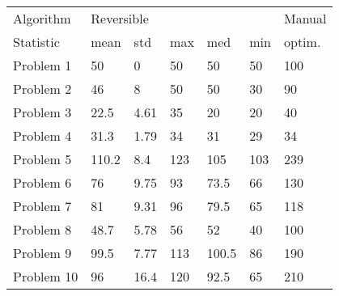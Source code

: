 \begin{tabular}{lllllll}
\toprule
Algorithm & \multicolumn{5}{l}{Reversible} & Manual \\
Statistic &       mean &   std &  max &    med &  min & optim. \\
\midrule
Problem 1  &         50 &     0 &   50 &     50 &   50 &    100 \\
Problem 2  &         46 &     8 &   50 &     50 &   30 &     90 \\
Problem 3  &       22.5 &  4.61 &   35 &     20 &   20 &     40 \\
Problem 4  &       31.3 &  1.79 &   34 &     31 &   29 &     34 \\
Problem 5  &      110.2 &   8.4 &  123 &    105 &  103 &    239 \\
Problem 6  &         76 &  9.75 &   93 &   73.5 &   66 &    130 \\
Problem 7  &         81 &  9.31 &   96 &   79.5 &   65 &    118 \\
Problem 8  &       48.7 &  5.78 &   56 &     52 &   40 &    100 \\
Problem 9  &       99.5 &  7.77 &  113 &  100.5 &   86 &    190 \\
Problem 10 &         96 &  16.4 &  120 &   92.5 &   65 &    210 \\
\bottomrule
\end{tabular}
